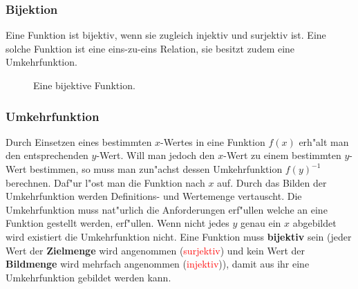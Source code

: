 \subsubsection{Bijektion}
Eine Funktion ist bijektiv, wenn sie zugleich injektiv und surjektiv ist. Eine solche Funktion ist eine eins-zu-eins Relation, sie besitzt zudem eine Umkehrfunktion.
\begin{figure}[h!]
 \centering
 \caption{Eine bijektive Funktion.}
\end{figure}

\subsubsection{Umkehrfunktion}
Durch Einsetzen eines bestimmten $x$-Wertes in eine Funktion $f(x)$ erh"alt man den entsprechenden $y$-Wert. Will man jedoch den $x$-Wert zu einem bestimmten $y$-Wert bestimmen, so muss man zun"achst dessen Umkehrfunktion $f(y)^{-1}$ berechnen. Daf"ur l"ost man die Funktion nach $x$ auf. Durch das Bilden der Umkehrfunktion werden Definitions- und Wertemenge vertauscht. Die Umkehrfunktion muss nat"urlich die Anforderungen erf"ullen welche an eine Funktion gestellt werden, erf"ullen. Wenn nicht jedes $y$ genau ein $x$ abgebildet wird existiert die Umkehrfunktion nicht. Eine Funktion muss \textbf{bijektiv} sein (jeder Wert der \textbf{Zielmenge} wird angenommen (\textcolor{red}{surjektiv}) und kein Wert der \textbf{Bildmenge} wird mehrfach angenommen (\textcolor{red}{injektiv})), damit aus ihr eine Umkehrfunktion gebildet werden kann.

